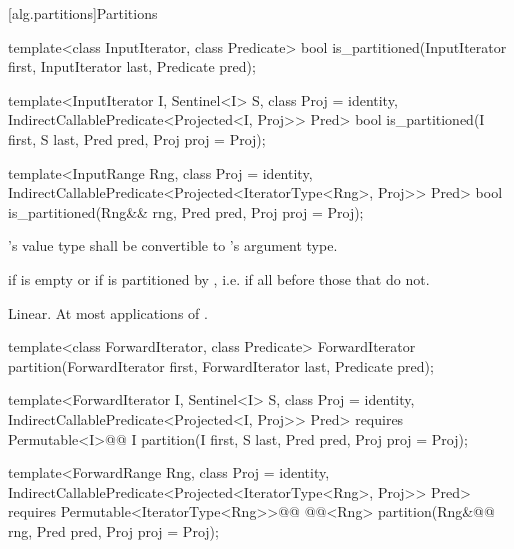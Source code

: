 [alg.partitions]{Partitions}

%
\begin{removedblock}
\begin{itemdecl}
template<class InputIterator, class Predicate>
  bool is_partitioned(InputIterator first, InputIterator last, Predicate pred);
\end{itemdecl}
\end{removedblock}
\begin{addedblock}
\begin{itemdecl}
template<InputIterator I, Sentinel<I> S, class Proj = identity,
    IndirectCallablePredicate<Projected<I, Proj>> Pred>
  bool is_partitioned(I first, S last, Pred pred, Proj proj = Proj{});

template<InputRange Rng, class Proj = identity,
    IndirectCallablePredicate<Projected<IteratorType<Rng>, Proj>> Pred>
  bool
    is_partitioned(Rng&& rng, Pred pred, Proj proj = Proj{});
\end{itemdecl}
\end{addedblock}

\begin{itemdescr}
\begin{removedblock}
\pnum
\requires {}'s value type shall be convertible to 's argument type.
\end{removedblock}

\pnum
\returns {} if
 is empty or if
 is partitioned by , i.e. if all
 before those that do not.

\pnum
\complexity Linear. At most  applications of .
\end{itemdescr}

%
\begin{removedblock}
\begin{itemdecl}
template<class ForwardIterator, class Predicate>
  ForwardIterator
    partition(ForwardIterator first,
              ForwardIterator last, Predicate pred);
\end{itemdecl}
\end{removedblock}
\begin{addedblock}
\begin{itemdecl}
template<ForwardIterator I, Sentinel<I> S, class Proj = identity,
    IndirectCallablePredicate<Projected<I, Proj>> Pred>
  requires Permutable<I>@\newtxt{()}@
  I partition(I first, S last, Pred pred, Proj proj = Proj{});

template<ForwardRange Rng, class Proj = identity,
    IndirectCallablePredicate<Projected<IteratorType<Rng>, Proj>> Pred>
  requires Permutable<IteratorType<Rng>>@\newtxt{()}@
  @@<Rng>
    partition(Rng&@\newtxt{\&}@ rng, Pred pred, Proj proj = Proj{});
\end{itemdecl}
\end{addedblock}

